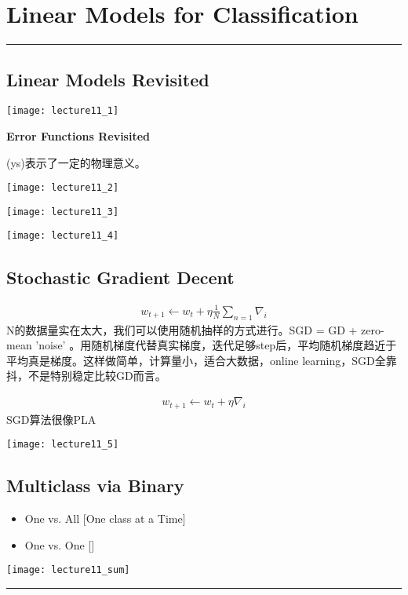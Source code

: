 \section{Linear Models for Classification}
\noindent
{\color{LightRubineRed} \rule{\linewidth}{1mm} }
\subsection{Linear Models Revisited}
\begin{center}
\texttt{[image: lecture11\_1]}\\
\end{center}
\textbf{Error Functions Revisited} \par
(ys)表示了一定的物理意义。 
\begin{center}
\texttt{[image: lecture11\_2]}\\
\end{center}
\begin{center}
\texttt{[image: lecture11\_3]}\\
\end{center}
\begin{center}
\texttt{[image: lecture11\_4]}\\
\end{center}
\subsection{Stochastic Gradient Decent}
\begin{align*}
w_{t+1} \gets w_t + \eta \frac{1}{N}\sum_{n=1}\nabla_i
\end{align*}
N的数据量实在太大，我们可以使用随机抽样的方式进行。SGD = GD + zero-mean 'noise' 。用随机梯度代替真实梯度，迭代足够step后，平均随机梯度趋近于平均真是梯度。这样做简单，计算量小，适合大数据，online learning，SGD全靠抖，不是特别稳定比较GD而言。 \par

\begin{align*}
w_{t+1} \gets w_t + \eta\nabla_i
\end{align*}
SGD算法很像PLA \par
\begin{center}
\texttt{[image: lecture11\_5]}\\
\end{center}

\subsection{Multiclass via Binary}
\begin{itemize}
	\item One vs. All [One class at a Time]
	\item One vs. One []
\end{itemize}
\begin{center}
\texttt{[image: lecture11\_sum]}\\
\end{center}
\noindent
{\color{RubineRed} \rule{\linewidth}{1mm} }

